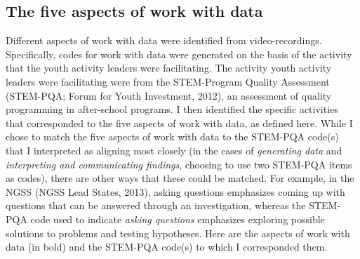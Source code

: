 \documentclass[]{book}
\theoremstyle{definition}
\theoremstyle{definition}
\theoremstyle{definition}
\theoremstyle{remark}
\begin{document}
\begin{table}

\caption{\label{tab:unnamed-chunk-3}ESM measures for profiles}
\centering
{}
\end{table}

\subsection{The five aspects of work with
data}\label{the-five-aspects-of-work-with-data}

Different aspects of work with data were identified from
video-recordings. Specifically, codes for work with data were generated
on the basis of the activity that the youth activity leaders were
facilitating. The activity youth activity leaders were facilitating were
from the STEM-Program Quality Assessment (STEM-PQA; Forum for Youth
Investment, 2012), an assessment of quality programming in after-school
programs. I then identified the specific activities that corresponded to
the five aspects of work with data, as defined here. While I chose to
match the five aspects of work with data to the STEM-PQA code(s) that I
interpreted as aligning most closely (in the cases of \emph{generating
data} and \emph{interpreting and communicating findings}, choosing to
use two STEM-PQA items as codes), there are other ways that these could
be matched. For example, in the NGSS (NGSS Lead States, 2013), asking
questions emphasizes coming up with questions that can be answered
through an investigation, whereas the STEM-PQA code used to indicate
\emph{asking questions} emphasizes exploring possible solutions to
problems and testing hypotheses. Here are the aspects of work with data
(in bold) and the STEM-PQA code(s) to which I corresponded them.
\end{document}
